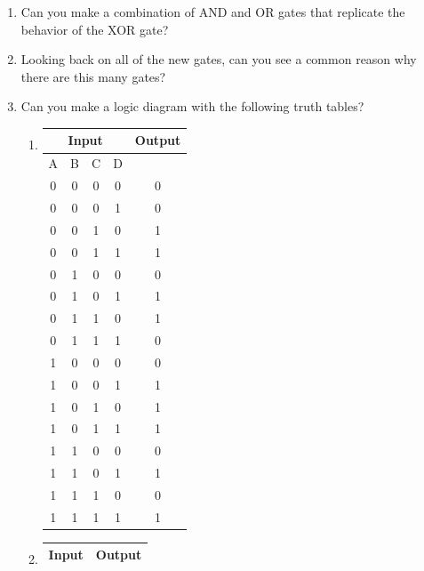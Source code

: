 \begin{enumerate}
    \item Can you make a combination of AND and OR gates that replicate the behavior of the XOR gate?
    \item Looking back on all of the new gates, can you see a common reason why there are this many gates?
    \item Can you make a logic diagram with the following truth tables?
        \begin{enumerate}
            \item 
                \begin{tabular}{|c|c|c|c|c|}
                    \hline
                    \multicolumn{4}{|c|}{Input} & Output\\ \hline
                    A & B & C & D &  \\ \hline
                    0 & 0 & 0 & 0 & 0 \\ \hline
                    0 & 0 & 0 & 1 & 0 \\ \hline
                    0 & 0 & 1 & 0 & 1 \\ \hline
                    0 & 0 & 1 & 1 & 1 \\ \hline
                    0 & 1 & 0 & 0 & 0 \\ \hline
                    0 & 1 & 0 & 1 & 1 \\ \hline
                    0 & 1 & 1 & 0 & 1 \\ \hline
                    0 & 1 & 1 & 1 & 0 \\ \hline
                    1 & 0 & 0 & 0 & 0 \\ \hline
                    1 & 0 & 0 & 1 & 1 \\ \hline
                    1 & 0 & 1 & 0 & 1 \\ \hline
                    1 & 0 & 1 & 1 & 1 \\ \hline
                    1 & 1 & 0 & 0 & 0 \\ \hline
                    1 & 1 & 0 & 1 & 1 \\ \hline
                    1 & 1 & 1 & 0 & 0 \\ \hline
                    1 & 1 & 1 & 1 & 1 \\ \hline
                \end{tabular}
            \item 
                \begin{tabular}{|c|c|c|c|c|}
                    \hline
                    \multicolumn{4}{|c|}{Input} & Output\\ \hline

\end{tabular}
\end{enumerate}
\end{enumerate}
